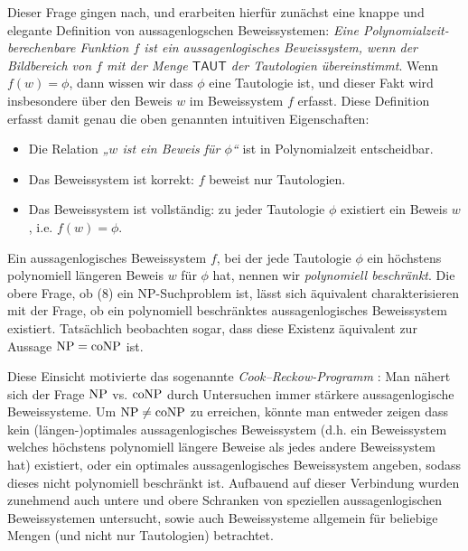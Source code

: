 Dieser Frage gingen \textcite{cook_relative_1979} nach, und erarbeiten hierfür zunächst eine knappe und elegante Definition von aussagenlogschen Beweissystemen: \emph{Eine Polynomialzeit-berechenbare Funktion $f$ ist ein \emph{aussagenlogisches Beweissystem}, wenn der Bildbereich von $f$ mit der Menge $\mathsf{TAUT}$ der Tautologien übereinstimmt}. Wenn $f(w)=\phi$, dann wissen wir dass $\phi$ eine Tautologie ist, und dieser Fakt wird insbesondere über den Beweis $w$ im Beweissystem $f$ erfasst. 
Diese Definition erfasst damit genau die oben genannten intuitiven Eigenschaften:
\begin{itemize}[noitemsep]
    \item Die Relation \emph{„$w$ ist ein Beweis für $\phi$“} ist in Polynomialzeit entscheidbar.
    \item Das Beweissystem ist korrekt: $f$ beweist nur Tautologien.
    \item Das Beweissystem ist vollständig: zu jeder Tautologie $\phi$ existiert ein Beweis $w$, i.e. $f(w)=\phi$.
\end{itemize}
Ein aussagenlogisches Beweissystem $f$, bei der jede Tautologie $\phi$ ein höchstens polynomiell längeren Beweis $w$ für $\phi$ hat, nennen wir \emph{polynomiell beschränkt}.
Die obere Frage, ob (8) ein NP-Suchproblem ist, lässt sich äquivalent charakterisieren mit der Frage, ob ein polynomiell beschränktes aussagenlogisches Beweissystem existiert.
Tatsächlich beobachten \citeauthor{cook_relative_1979} sogar, dass diese Existenz äquivalent zur Aussage $\mathrm{NP}=\mathrm{coNP}$ ist.

Diese Einsicht motivierte das sogenannte \emph{Cook--Reckow-Programm} \parencite{buss_lectures_1996}: Man nähert sich der Frage $\mathrm{NP}$ vs. $\mathrm{coNP}$ durch Untersuchen immer stärkere aussagenlogische Beweissysteme.
Um $\mathrm{NP}\neq\mathrm{coNP}$ zu erreichen, könnte man entweder zeigen dass kein (längen-)optimales aussagenlogisches Beweissystem (d.h. ein Beweissystem welches höchstens polynomiell längere Beweise als jedes andere Beweissystem hat) existiert, oder ein optimales aussagenlogisches Beweissystem angeben, sodass dieses nicht polynomiell beschränkt ist.
Aufbauend auf dieser Verbindung wurden zunehmend auch untere und obere Schranken von speziellen aussagenlogischen Beweissystemen untersucht, sowie auch Beweissysteme allgemein für beliebige Mengen (und nicht nur Tautologien) betrachtet.

